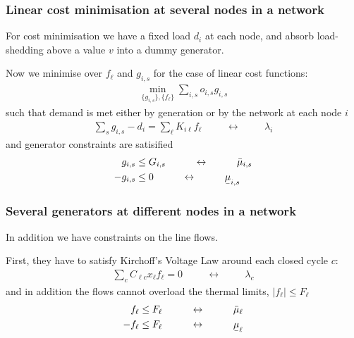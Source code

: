 \documentclass[10pt,aspectratio=169,dvipsnames]{beamer}
\def\l{\lambda}
\def\m{\mu}
\newcommand{\ubar}[1]{\text{\b{$#1$}}}
\begin{document}
\begin{frame}[fragile]
  \frametitle{Linear cost minimisation at several nodes in a network}

  For cost minimisation we have a fixed load $d_i$ at each node, and
  absorb load-shedding above a value $v$ into a dummy generator.

  Now we minimise over $f_\ell$ and $g_{i,s}$ for the case of linear cost functions:
  \begin{align*}
    \min_{\{g_{i,s}\},\{f_\ell\}}  \sum_{i,s} o_{i,s} g_{i,s}
  \end{align*}
  such that demand is met either by generation or by the network at each node $i$
  \begin{align*}
    \sum_{s} g_{i,s} - d_i = \sum_\ell K_{i\ell}f_\ell  \hspace{1cm}\leftrightarrow\hspace{1cm} \l_i
  \end{align*}
  and generator constraints are satisified
    \begin{align*}
        g_{i,s}  & \leq  G_{i,s}  \hspace{1cm}\leftrightarrow\hspace{1cm} \bar{\m}_{i,s} \\
    - g_{i,s}  & \leq  0  \hspace{1cm}\leftrightarrow\hspace{1cm} \ubar{\m}_{i,s}
  \end{align*}



\end{frame}

\begin{frame}[fragile]
  \frametitle{Several generators at different nodes in a network}

  In addition we have constraints on the line flows.

  First, they have to satisfy Kirchoff's Voltage Law around each closed cycle $c$:
  \begin{align*}
    \sum_{c} C_{\ell c} x_\ell f_\ell = 0  \hspace{1cm}\leftrightarrow\hspace{1cm} \l_c
  \end{align*}
  and in addition the flows cannot overload the thermal limits, $|f_\ell| \leq F_\ell$
  \begin{align*}
    f_\ell \leq F_\ell  \hspace{1cm}\leftrightarrow\hspace{1cm} \bar{\m}_\ell \\
        - f_\ell \leq F_\ell  \hspace{1cm}\leftrightarrow\hspace{1cm} \ubar{\m}_\ell
  \end{align*}

\end{frame}
\end{document}
